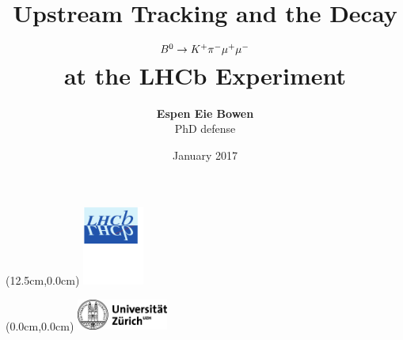 \documentclass[aspectratio=1610]{beamer}
\begin{document}
\title[]{Upstream Tracking and the Decay ${B}^{0} \rightarrow K^{+}\pi^{-}\mu^{+}\mu^{-}$\\ at the LHCb Experiment}
\author[Espen Eie Bowen]{{\bf Espen Eie Bowen} \\ {\small PhD defense}} 
\institute[]{}
\date{ January 2017}
\begin{frame}[plain]
\titlepage
\begin{textblock*}{2cm}(12.5cm,0.0cm)
  \includegraphics[width=2cm]{figs/lhcb-logo.pdf}
\end{textblock*}
\begin{textblock*}{5cm}(0.0cm,0.0cm)
  \includegraphics[width=3.0cm]{figs/uzh.jpg}
\end{textblock*}
\end{frame}
\end{document}
